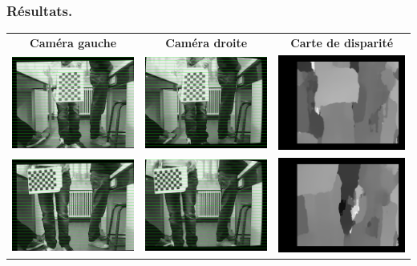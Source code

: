 \begin{frame}
    \frametitle{Résultats.}
    \begin{tabular}{ccc}
        \textbf{Caméra gauche} & \textbf{Caméra droite} & \textbf{Carte de disparité} \\
        \includegraphics[width=0.3\linewidth]{rcs/rem0l.png} & \includegraphics[width=0.3\linewidth]{rcs/rem0r.png} & \includegraphics[width=0.3\linewidth]{rcs/disp0.png} \\
        \includegraphics[width=0.3\linewidth]{rcs/rem1l.png} & \includegraphics[width=0.3\linewidth]{rcs/rem1r.png} & \includegraphics[width=0.3\linewidth]{rcs/disp1.png} \\

\end{tabular}
\end{frame}
